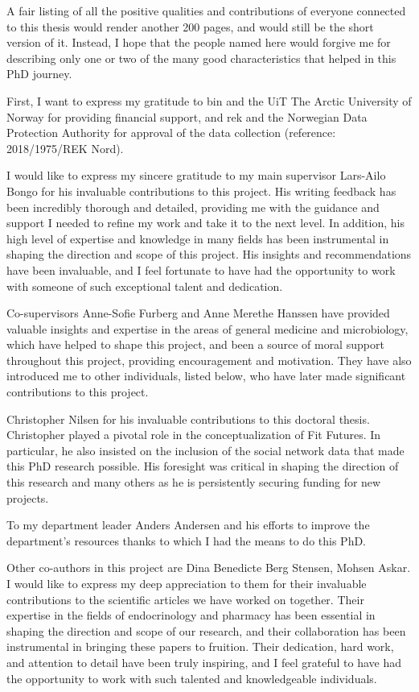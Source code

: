 \documentclass[12pt,twoside,a4paper,fleqn, english]{report}
\begin{document}
    A fair listing of all the positive qualities and contributions of everyone connected to this thesis would render another 200 pages, and would still be the short version of it. Instead, I hope that the people named here would forgive me for describing only one or two of the many good characteristics that helped in this PhD journey.

    First, I want to express my gratitude to \gls{bin} and the UiT The Arctic University of Norway for providing financial support, and \gls{rek} and the Norwegian Data Protection Authority for approval of the data collection (reference: 2018/1975/REK Nord).
 
    I would like to express my sincere gratitude to my main supervisor Lars-Ailo Bongo for his invaluable contributions to this project. His writing feedback has been incredibly thorough and detailed, providing me with the guidance and support I needed to refine my work and take it to the next level. In addition, his high level of expertise and knowledge in many fields has been instrumental in shaping the direction and scope of this project. His insights and recommendations have been invaluable, and I feel fortunate to have had the opportunity to work with someone of such exceptional talent and dedication.

    Co-supervisors Anne-Sofie Furberg and Anne Merethe Hanssen have provided valuable insights and expertise in the areas of general medicine and microbiology, which have helped to shape this project, and been a source of moral support throughout this project, providing encouragement and motivation. They have also introduced me to other individuals, listed below, who have later made significant contributions to this project.

    Christopher Nilsen for his invaluable contributions to this doctoral thesis. Christopher played a pivotal role in the conceptualization of Fit Futures. In particular, he also insisted on the inclusion of the social network data that made this PhD research possible. His foresight was critical in shaping the direction of this research and many others as he is persistently securing funding for new projects.

    To my department leader Anders Andersen and his efforts to improve the department's resources thanks to which I had the means to do this PhD.

    Other co-authors in this project are Dina Benedicte Berg Stensen, Mohsen Askar. I would like to express my deep appreciation to them for their invaluable contributions to the scientific articles we have worked on together. Their expertise in the fields of endocrinology and pharmacy has been essential in shaping the direction and scope of our research, and their collaboration has been instrumental in bringing these papers to fruition. Their dedication, hard work, and attention to detail have been truly inspiring, and I feel grateful to have had the opportunity to work with such talented and knowledgeable individuals.
    
\end{document}
